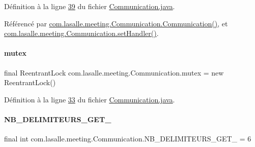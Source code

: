 Définition à la ligne \hyperlink{_communication_8java_source_l00039}{39} du fichier \hyperlink{_communication_8java_source}{Communication.\+java}.



Référencé par \hyperlink{_communication_8java_source_l00056}{com.\+lasalle.\+meeting.\+Communication.\+Communication()}, et \hyperlink{_communication_8java_source_l00112}{com.\+lasalle.\+meeting.\+Communication.\+set\+Handler()}.

\mbox{\label{classcom_1_1lasalle_1_1meeting_1_1_communication_af123afba8dcddc259017fb5c3b431dab}} 
\paragraph{\texorpdfstring{mutex}{mutex}}
{\footnotesize\ttfamily final Reentrant\+Lock com.\+lasalle.\+meeting.\+Communication.\+mutex = new Reentrant\+Lock()\hspace{0.3cm}{\ttfamily [private]}}



Définition à la ligne \hyperlink{_communication_8java_source_l00033}{33} du fichier \hyperlink{_communication_8java_source}{Communication.\+java}.

\mbox{\label{classcom_1_1lasalle_1_1meeting_1_1_communication_a28886dc20c115ada2e1e3ee745805643}} 
\paragraph{\texorpdfstring{N\+B\+\_\+\+D\+E\+L\+I\+M\+I\+T\+E\+U\+R\+S\+\_\+\+G\+E\+T\+\_}{NB\_DELIMITEURS\_GET\_1}}
{\footnotesize\ttfamily final int com.\+lasalle.\+meeting.\+Communication.\+N\+B\+\_\+\+D\+E\+L\+I\+M\+I\+T\+E\+U\+R\+S\+\_\+\+G\+E\+T\+\_ = 6\hspace{0.3cm}{\ttfamily [static]}}



